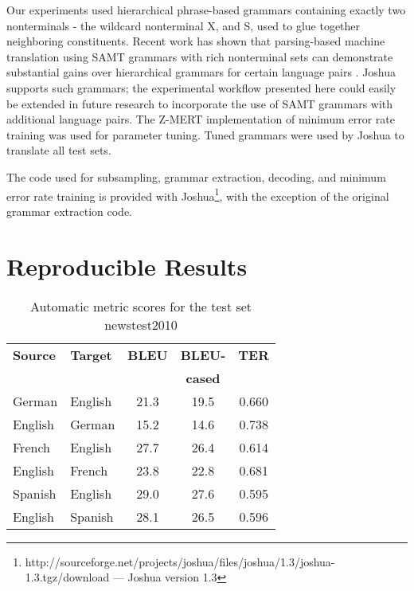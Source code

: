 \documentclass[11pt]{article}
\begin{document}
Our experiments used hierarchical phrase-based grammars containing exactly two nonterminals - the wildcard nonterminal X, and S, used to glue together neighboring constituents. Recent work has shown that parsing-based machine translation using SAMT \cite{samt2006} grammars with rich nonterminal sets can demonstrate substantial gains over hierarchical grammars for certain language pairs \cite{SCALE-report}. Joshua supports such grammars; the experimental workflow presented here could easily be extended in future research to incorporate the use of SAMT grammars with additional language pairs. The Z-MERT implementation \cite{Zaidan2009} of minimum error rate training was used for parameter tuning. Tuned grammars were used by Joshua to translate all test sets. 

The code used for subsampling, grammar extraction, decoding, and minimum error rate training is provided with Joshua\footnote{http://sourceforge.net/projects/joshua/files/joshua/1.3/joshua-1.3.tgz/download --- Joshua version 1.3}, with the exception of the original \cite{Lopez2008} grammar extraction code.











\section{Reproducible Results}
\label{Results}

\begin{table}[h]
\begin{center}
\begin{tabular}{|l|l||c|c|c|}
\hline
\bf Source & \bf Target & \bf BLEU & \bf BLEU- & \bf TER \\
& & & \bf cased & \\
\hline
German & English & 21.3 & 19.5 & 0.660 \\ \hline
English & German & 15.2  & 14.6  & 0.738 \\ \hline
French & English & 27.7 & 26.4 & 0.614 \\ \hline
English & French & 23.8 & 22.8 & 0.681 \\ \hline
Spanish & English & 29.0 & 27.6 & 0.595 \\ \hline
English & Spanish & 28.1 & 26.5 & 0.596  \\ \hline
\end{tabular}
\end{center}
\caption{\label{scores} Automatic metric scores for the test set newstest2010 }
\end{table}
\end{document}
